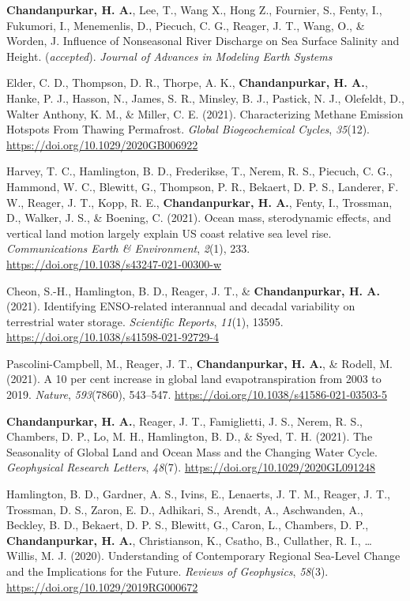 \documentclass[10pt]{article}
\begin{document}
\label{csl:0}\textbf{Chandanpurkar, H. A.}, Lee, T., Wang X., Hong Z., Fournier, S., Fenty, I., Fukumori, I., Menemenlis, D., Piecuch, C. G., Reager, J. T., Wang, O., \& Worden, J. {Influence of Nonseasonal River Discharge on Sea Surface Salinity and Height}. (\textit{accepted}). \textit{Journal of Advances in Modeling Earth Systems}

\label{csl:0}Elder, C. D., Thompson, D. R., Thorpe, A. K., \textbf{Chandanpurkar, H. A.}, Hanke, P. J., Hasson, N., James, S. R., Minsley, B. J., Pastick, N. J., Olefeldt, D., Walter Anthony, K. M., \& Miller, C. E. (2021). {Characterizing Methane Emission Hotspots From Thawing Permafrost}. \textit{Global Biogeochemical Cycles}, \textit{35}(12). \url{https://doi.org/10.1029/2020GB006922}

\label{csl:0}Harvey, T. C., Hamlington, B. D., Frederikse, T., Nerem, R. S., Piecuch, C. G., Hammond, W. C., Blewitt, G., Thompson, P. R., Bekaert, D. P. S., Landerer, F. W., Reager, J. T., Kopp, R. E., \textbf{Chandanpurkar, H. A.}, Fenty, I., Trossman, D., Walker, J. S., \& Boening, C. (2021). {Ocean mass, sterodynamic effects, and vertical land motion largely explain US coast relative sea level rise}. \textit{Communications Earth \& Environment}, \textit{2}(1), 233. \url{https://doi.org/10.1038/s43247-021-00300-w}

\label{csl:0}Cheon, S.-H., Hamlington, B. D., Reager, J. T., \& \textbf{Chandanpurkar, H. A. }(2021). {Identifying ENSO-related interannual and decadal variability on terrestrial water storage}. \textit{Scientific Reports}, \textit{11}(1), 13595. \url{https://doi.org/10.1038/s41598-021-92729-4}

\label{csl:0}Pascolini-Campbell, M., Reager, J. T., \textbf{Chandanpurkar, H. A.}, \& Rodell, M. (2021). {A 10 per cent increase in global land evapotranspiration from 2003 to 2019}. \textit{Nature}, \textit{593}(7860), 543–547. \url{https://doi.org/10.1038/s41586-021-03503-5}

\label{csl:0}\textbf{Chandanpurkar, H. A.}, Reager, J. T., Famiglietti, J. S., Nerem, R. S., Chambers, D. P., Lo, M. H., Hamlington, B. D., \& Syed, T. H. (2021). {The Seasonality of Global Land and Ocean Mass and the Changing Water Cycle}. \textit{Geophysical Research Letters}, \textit{48}(7). \url{https://doi.org/10.1029/2020GL091248}

\label{csl:0}Hamlington, B. D., Gardner, A. S., Ivins, E., Lenaerts, J. T. M., Reager, J. T., Trossman, D. S., Zaron, E. D., Adhikari, S., Arendt, A., Aschwanden, A., Beckley, B. D., Bekaert, D. P. S., Blewitt, G., Caron, L., Chambers, D. P.,\textbf{ Chandanpurkar, H. A.}, Christianson, K., Csatho, B., Cullather, R. I., … Willis, M. J. (2020). {Understanding of Contemporary Regional Sea-Level Change and the Implications for the Future}. \textit{Reviews of Geophysics}, \textit{58}(3). \url{https://doi.org/10.1029/2019RG000672}
\end{document}
